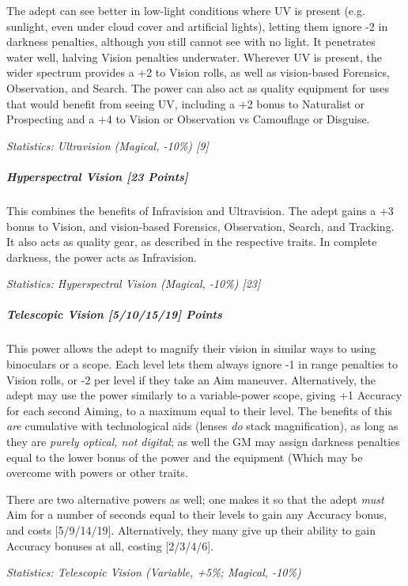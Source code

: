 \begin{multicols}{3}
		The adept can see better in low-light conditions where UV is present (e.g. sunlight, even under cloud cover and artificial lights), letting them ignore -2 in darkness penalties, although you still cannot see with no light. It penetrates water well, halving Vision penalties underwater. Wherever UV is present, the wider spectrum provides a +2 to Vision rolls, as well as vision-based Forensics, Observation, and Search. The power can also act as quality equipment for uses that would benefit from seeing UV, including a +2 bonus to Naturalist or Prospecting and a +4 to Vision or Observation vs Camouflage or Disguise.
	
		\textcolor{OliveGreen}{\textit{Statistics: Ultravision (Magical, -10\%) [9] }}
			
	\subparagraph{Hyperspectral Vision [23 Points]}
	
		This combines the benefits of Infravision and Ultravision. The adept gains a +3 bonus to Vision, and vision-based Forensics, Observation, Search, and Tracking. It also acts as quality gear, as described in the respective traits. In complete darkness, the power acts as Infravision.
	
		\textcolor{OliveGreen}{\textit{Statistics: Hyperspectral Vision (Magical, -10\%) [23] }}
	
	\subparagraph{Telescopic Vision [5/10/15/19] Points}
	
		This power allows the adept to magnify their vision in similar ways to using binoculars or a scope. Each level lets them always ignore -1 in range penalties to Vision rolls, or -2 per level if they take an Aim maneuver. Alternatively, the adept may use the power similarly to a variable-power scope, giving +1 Accuracy for each second Aiming, to a maximum equal to their level. The benefits of this \textit{are} cumulative with technological aids (lenses \textit{do} stack magnification), as long as they are \textit{purely optical, not digital}; as well the GM may assign darkness penalties equal to the lower bonus of the power and the equipment (Which may be overcome with powers or other traits.
		
		There are two alternative powers as well; one makes it so that the adept \textit{must} Aim for a number of seconds equal to their levels to gain any Accuracy bonus, and costs [5/9/14/19]. Alternatively, they many give up their ability to gain Accuracy bonuses at all, costing [2/3/4/6].
	
		\textcolor{OliveGreen}{\textit{Statistics: Telescopic Vision (Variable, +5\%; Magical, -10\%) }}
	

\end{multicols}
